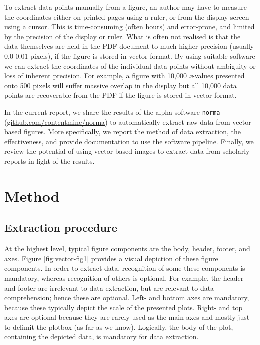\documentclass[a5paper]{book}
\begin{document}
To extract data points manually from a figure, an author may have to
measure the coordinates either on printed pages using a ruler, or from
the display screen using a cursor. This is time-consuming (often hours)
and error-prone, and limited by the precision of the display or ruler.
What is often not realised is that the data themselves are held in the
PDF document to much higher precision (usually 0.0-0.01 pixels), if the
figure is stored in vector format. By using suitable software we can
extract the coordinates of the individual data points without ambiguity
or loss of inherent precision. For example, a figure with 10,000
\emph{x}-values presented onto 500 pixels will suffer massive overlap in
the display but all 10,000 data points are recoverable from the PDF if
the figure is stored in vector format.

In the current report, we share the results of the alpha software
\texttt{norma}
(\href{https://github.com/contentmine/norma}{github.com/contentmine/norma})
to automatically extract raw data from vector based figures. More
specifically, we report the method of data extraction, the
effectiveness, and provide documentation to use the software pipeline.
Finally, we review the potential of using vector based images to extract
data from scholarly reports in light of the results.

\section{Method}\label{method-3}

\hypertarget{extraction-procedure}{\subsection{Extraction
procedure}\label{extraction-procedure}}

At the highest level, typical figure components are the body, header,
footer, and axes. Figure \ref{fig:vector-fig1} provides a visual
depiction of these figure components. In order to extract data,
recognition of some these components is mandatory, whereas recognition
of others is optional. For example, the header and footer are irrelevant
to data extraction, but are relevant to data comprehension; hence these
are optional. Left- and bottom axes are mandatory, because these
typically depict the scale of the presented plots. Right- and top axes
are optional because they are rarely used as the main axes and mostly
just to delimit the plotbox (as far as we know). Logically, the body of
the plot, containing the depicted data, is mandatory for data
extraction.
\end{document}
